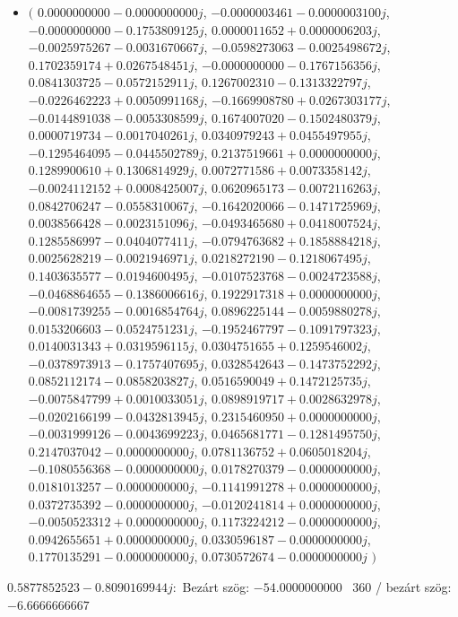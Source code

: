 \documentclass[14pt,a4paper]{article}
\begin{document}
\begin{itemize}
\item
$\big($
$0.0000000000-0.0000000000j$, $-0.0000003461-0.0000003100j$, $-0.0000000000-0.1753809125j$, $0.0000011652+0.0000006203j$, $-0.0025975267-0.0031670667j$, $-0.0598273063-0.0025498672j$, $0.1702359174+0.0267548451j$, $-0.0000000000-0.1767156356j$, $0.0841303725-0.0572152911j$, $0.1267002310-0.1313322797j$, $-0.0226462223+0.0050991168j$, $-0.1669908780+0.0267303177j$, $-0.0144891038-0.0053308599j$, $0.1674007020-0.1502480379j$, $0.0000719734-0.0017040261j$, $0.0340979243+0.0455497955j$, $-0.1295464095-0.0445502789j$, $0.2137519661+0.0000000000j$, $0.1289900610+0.1306814929j$, $0.0072771586+0.0073358142j$, $-0.0024112152+0.0008425007j$, $0.0620965173-0.0072116263j$, $0.0842706247-0.0558310067j$, $-0.1642020066-0.1471725969j$, $0.0038566428-0.0023151096j$, $-0.0493465680+0.0418007524j$, $0.1285586997-0.0404077411j$, $-0.0794763682+0.1858884218j$, $0.0025628219-0.0021946971j$, $0.0218272190-0.1218067495j$, $0.1403635577-0.0194600495j$, $-0.0107523768-0.0024723588j$, $-0.0468864655-0.1386006616j$, $0.1922917318+0.0000000000j$, $-0.0081739255-0.0016854764j$, $0.0896225144-0.0059880278j$, $0.0153206603-0.0524751231j$, $-0.1952467797-0.1091797323j$, $0.0140031343+0.0319596115j$, $0.0304751655+0.1259546002j$, $-0.0378973913-0.1757407695j$, $0.0328542643-0.1473752292j$, $0.0852112174-0.0858203827j$, $0.0516590049+0.1472125735j$, $-0.0075847799+0.0010033051j$, $0.0898919717+0.0028632978j$, $-0.0202166199-0.0432813945j$, $0.2315460950+0.0000000000j$, $-0.0031999126-0.0043699223j$, $0.0465681771-0.1281495750j$, $0.2147037042-0.0000000000j$, $0.0781136752+0.0605018204j$, $-0.1080556368-0.0000000000j$, $0.0178270379-0.0000000000j$, $0.0181013257-0.0000000000j$, $-0.1141991278+0.0000000000j$, $0.0372735392-0.0000000000j$, $-0.0120241814+0.0000000000j$, $-0.0050523312+0.0000000000j$, $0.1173224212-0.0000000000j$, $0.0942655651+0.0000000000j$, $0.0330596187-0.0000000000j$, $0.1770135291-0.0000000000j$, $0.0730572674-0.0000000000j$
$\big)$
\end{itemize}
$0.5877852523-0.8090169944j$:\
Bezárt szög: $-54.0000000000$ \
360 / bezárt szög: $-6.6666666667$\
\end{document}
